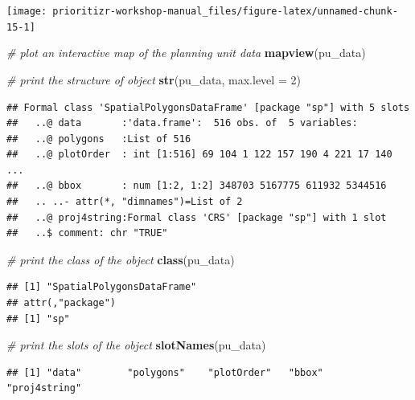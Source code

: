 \documentclass[12pt,]{book}
\newenvironment{Shaded}{\begin{snugshade}}{\end{snugshade}}
\newcommand{\CommentTok}[1]{\textcolor[rgb]{0.56,0.35,0.01}{\textit{#1}}}
\newcommand{\DataTypeTok}[1]{\textcolor[rgb]{0.13,0.29,0.53}{#1}}
\newcommand{\DecValTok}[1]{\textcolor[rgb]{0.00,0.00,0.81}{#1}}
\newcommand{\KeywordTok}[1]{\textcolor[rgb]{0.13,0.29,0.53}{\textbf{#1}}}
\newcommand{\NormalTok}[1]{#1}
\begin{document}
\begin{center}\texttt{[image: prioritizr-workshop-manual\_files/figure-latex/unnamed-chunk-15-1]} \end{center}

\begin{Shaded}
\begin{Highlighting}[]
\CommentTok{# plot an interactive map of the planning unit data}
\KeywordTok{mapview}\NormalTok{(pu_data)}
\end{Highlighting}
\end{Shaded}

\begin{Shaded}
\begin{Highlighting}[]
\CommentTok{# print the structure of object}
\KeywordTok{str}\NormalTok{(pu_data, }\DataTypeTok{max.level =} \DecValTok{2}\NormalTok{)}
\end{Highlighting}
\end{Shaded}

\begin{verbatim}
## Formal class 'SpatialPolygonsDataFrame' [package "sp"] with 5 slots
##   ..@ data       :'data.frame':  516 obs. of  5 variables:
##   ..@ polygons   :List of 516
##   ..@ plotOrder  : int [1:516] 69 104 1 122 157 190 4 221 17 140 ...
##   ..@ bbox       : num [1:2, 1:2] 348703 5167775 611932 5344516
##   .. ..- attr(*, "dimnames")=List of 2
##   ..@ proj4string:Formal class 'CRS' [package "sp"] with 1 slot
##   ..$ comment: chr "TRUE"
\end{verbatim}

\begin{Shaded}
\begin{Highlighting}[]
\CommentTok{# print the class of the object}
\KeywordTok{class}\NormalTok{(pu_data)}
\end{Highlighting}
\end{Shaded}

\begin{verbatim}
## [1] "SpatialPolygonsDataFrame"
## attr(,"package")
## [1] "sp"
\end{verbatim}

\begin{Shaded}
\begin{Highlighting}[]
\CommentTok{# print the slots of the object}
\KeywordTok{slotNames}\NormalTok{(pu_data)}
\end{Highlighting}
\end{Shaded}

\begin{verbatim}
## [1] "data"        "polygons"    "plotOrder"   "bbox"        "proj4string"
\end{verbatim}
\end{document}
